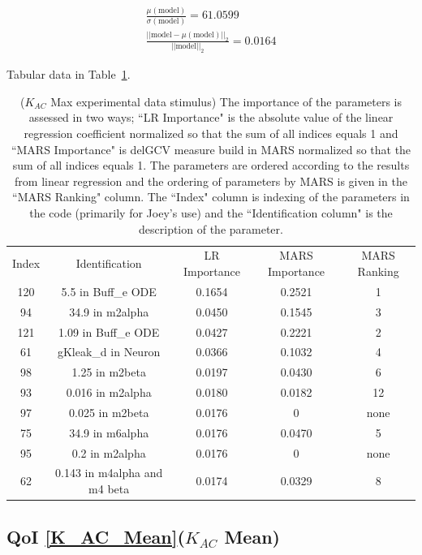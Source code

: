 \documentclass[12pt]{article}
\numberwithin{equation}{section}
\begin{document}
\begin{eqnarray*}
\frac{\mu(\text{model})}{\sigma(\text{model})} = 61.0599\\
\frac{\vert \vert \text{model}-\mu(\text{model}) \vert \vert_2 }{\vert \vert \text{model}\vert \vert_2 } = 0.0164
\end{eqnarray*}

Tabular data in Table~\ref{qoi_K_AC_Max_ex}.

\begin{table}[h]
\centering
\begin{tabular}{ccccc}
Index & Identification & LR Importance & MARS Importance & MARS Ranking \\
120 & 5.5 in Buff\_e ODE & 0.1654 & 0.2521 & 1\\
94 & 34.9 in m2alpha & 0.0450 & 0.1545 & 3\\
121 & 1.09 in Buff\_e ODE &  0.0427 & 0.2221 & 2\\
61 & gKleak\_d in Neuron & 0.0366 & 0.1032 & 4\\
98 & 1.25 in m2beta & 0.0197 & 0.0430 & 6\\
93 & 0.016 in m2alpha & 0.0180 & 0.0182 & 12\\
97 & 0.025 in m2beta & 0.0176 &  0 & none\\
75 & 34.9 in m6alpha & 0.0176 & 0.0470 & 5\\
95 & 0.2 in m2alpha & 0.0176 & 0 & none\\
62 & 0.143 in m4alpha and m4 beta &  0.0174 & 0.0329 & 8\\
\end{tabular}
\caption{ ($K_{AC}$ Max experimental data stimulus) The importance of the parameters is assessed in two ways; ``LR Importance" is the absolute value of the linear regression coefficient normalized so that the sum of all indices equals 1 and ``MARS Importance" is delGCV measure build in MARS normalized so that the sum of all indices equals 1. The parameters are ordered according to the results from linear regression and the ordering of parameters by MARS is given in the ``MARS Ranking" column. The ``Index" column is indexing of the parameters in the code (primarily for Joey's use) and the ``Identification column" is the description of the parameter.}
\label{qoi_K_AC_Max_ex}
\end{table}

\newpage
\subsection{QoI \eqref{K_AC_Mean}($K_{AC}$ Mean)}
\end{document}
